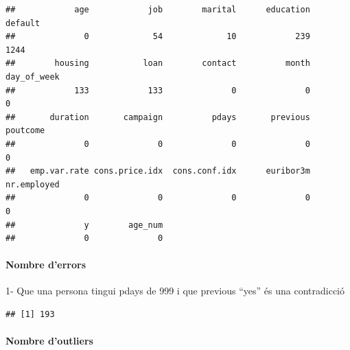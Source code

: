 \documentclass[
]{article}
\newenvironment{Shaded}{\begin{snugshade}}{\end{snugshade}}
\newcommand{\ConstantTok}[1]{\textcolor[rgb]{0.00,0.00,0.00}{#1}}
\newcommand{\DecValTok}[1]{\textcolor[rgb]{0.00,0.00,0.81}{#1}}
\newcommand{\FunctionTok}[1]{\textcolor[rgb]{0.00,0.00,0.00}{#1}}
\newcommand{\NormalTok}[1]{#1}
\newcommand{\OtherTok}[1]{\textcolor[rgb]{0.56,0.35,0.01}{#1}}
\newcommand{\SpecialCharTok}[1]{\textcolor[rgb]{0.00,0.00,0.00}{#1}}
\newcommand{\StringTok}[1]{\textcolor[rgb]{0.31,0.60,0.02}{#1}}
\begin{document}
\begin{verbatim}
##            age            job        marital      education        default 
##              0             54             10            239           1244 
##        housing           loan        contact          month    day_of_week 
##            133            133              0              0              0 
##       duration       campaign          pdays       previous       poutcome 
##              0              0              0              0              0 
##   emp.var.rate cons.price.idx  cons.conf.idx      euribor3m    nr.employed 
##              0              0              0              0              0 
##              y        age_num 
##              0              0
\end{verbatim}

\hypertarget{nombre-derrors}{%
\paragraph{Nombre d'errors}\label{nombre-derrors}}

1- Que una persona tingui pdays de 999 i que previous ``yes'' és una
contradicció

\begin{Shaded}
\end{Shaded}

\begin{verbatim}
## [1] 193
\end{verbatim}

\begin{Shaded}
\end{Shaded}

\hypertarget{nombre-doutliers}{%
\paragraph{Nombre d'outliers}\label{nombre-doutliers}}
\end{document}
